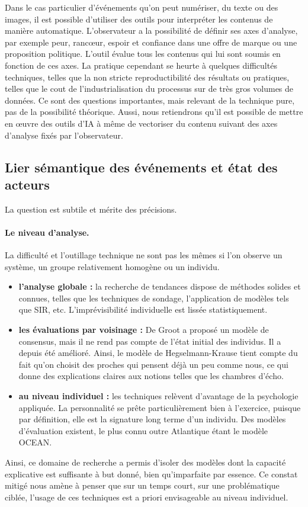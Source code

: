 \documentclass[11pt]{article}
\begin{document}
			Dans le cas particulier d'événements qu'on peut numériser, du texte ou des images, il est possible d'utiliser des outils pour interpréter les contenus de manière automatique. L'observateur a la possibilité de définir ses axes d'analyse, par exemple peur, rancœur, espoir et confiance dans une offre de marque ou une proposition politique. L'outil évalue tous les contenus qui lui sont soumis en fonction de ces axes. La pratique cependant se heurte à quelques difficultés techniques, telles que la non stricte reproductibilité des résultats ou pratiques, telles que le cout de l'industrialisation du processus sur de très gros volumes de données. Ce sont des questions importantes, mais relevant de la technique pure, pas de la possibilité théorique. Aussi, nous retiendrons qu'il est possible de mettre en œuvre des outils d'IA à même de vectoriser du contenu suivant des axes d'analyse fixés par l'observateur. 
			
			\subsection{Lier sémantique des événements et état des acteurs}
			
			La question est subtile et mérite des précisions. 
			
			\paragraph{Le niveau d'analyse. } La difficulté et l'outillage technique ne sont pas les mêmes si l'on observe un système, un groupe relativement homogène ou un individu. 
			\begin{itemize}
				\item \textbf{l'analyse globale :} la recherche de tendances dispose de méthodes solides et connues, telles que les techniques de sondage, l'application de modèles tels que SIR, etc. L'imprévisibilité individuelle est lissée statistiquement. 
				\item \textbf{les évaluations par voisinage :} De Groot a proposé un modèle de consensus, mais il ne rend pas compte de l'état initial des individus. Il a depuis été amélioré. Ainsi, le modèle de Hegselmann-Krause tient compte du fait qu'on choisit des proches qui pensent déjà un peu comme nous, ce qui donne des explications claires aux notions telles que les chambres d'écho. 
				\item \textbf{au niveau individuel :} les techniques relèvent d'avantage de la psychologie appliquée. La personnalité se prête particulièrement bien à l'exercice, puisque par définition, elle est la signature long terme d'un individu. Des modèles d'évaluation existent, le plus connu outre Atlantique étant le modèle OCEAN. 
			\end{itemize}
			Ainsi, ce domaine de recherche a permis d'isoler des modèles dont la capacité explicative est suffisante à but donné, bien qu'imparfaite par essence. Ce constat mitigé nous amène à penser que sur un temps court, sur une problématique ciblée, l'usage de ces techniques est a priori envisageable au niveau individuel. 
			
\end{document}
